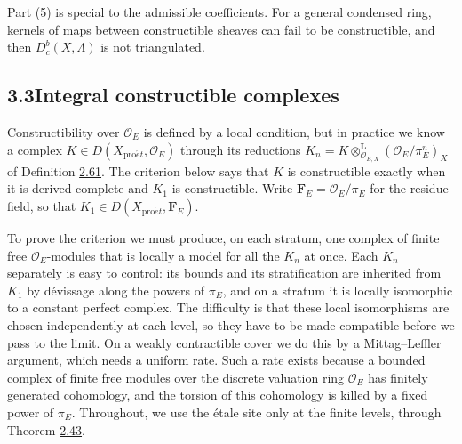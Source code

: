 \documentclass[11pt]{article}
\providecommand{\Dbc}{}\renewcommand{\Dbc}{D^b_c}
\begin{document}
\label{bp204}%
Part (5) is special to the admissible coefficients. For a general condensed ring, kernels of maps between constructible sheaves can fail to be constructible, and then \(\Dbc(X,\Lambda)\) is not triangulated.


\subsection*{\texorpdfstring{3.3\quad Integral constructible complexes}{3.3 Integral constructible complexes}}
\label{bp205}%
\label{bp206}%
Constructibility over \(\mathcal O_E\) is defined by a local condition, but in practice we know a complex \(K\in D(X_{\mathrm{pro}\acute{e}t},\mathcal O_E)\) through its reductions \(K_n=K\otimes^{\mathbf L}_{\mathcal O_{E,X}}(\mathcal O_E/\pi_E^n)_X\) of Definition \hyperref[bp188]{2.61}. The criterion below says that \(K\) is constructible exactly when it is derived complete and \(K_1\) is constructible. Write \(\mathbf F_E=\mathcal O_E/\pi_E\) for the residue field, so that \(K_1\in D(X_{\mathrm{pro}\acute{e}t},\mathbf F_E)\).

To prove the criterion we must produce, on each stratum, one complex of finite free \(\mathcal O_E\)-modules that is locally a model for all the \(K_n\) at once. Each \(K_n\) separately is easy to control: its bounds and its stratification are inherited from \(K_1\) by dévissage along the powers of \(\pi_E\), and on a stratum it is locally isomorphic to a constant perfect complex. The difficulty is that these local isomorphisms are chosen independently at each level, so they have to be made compatible before we pass to the limit. On a weakly contractible cover we do this by a Mittag–Leffler argument, which needs a uniform rate. Such a rate exists because a bounded complex of finite free modules over the discrete valuation ring \(\mathcal O_E\) has finitely generated cohomology, and the torsion of this cohomology is killed by a fixed power of \(\pi_E\). Throughout, we use the étale site only at the finite levels, through Theorem \hyperref[bp129]{2.43}.
\end{document}
